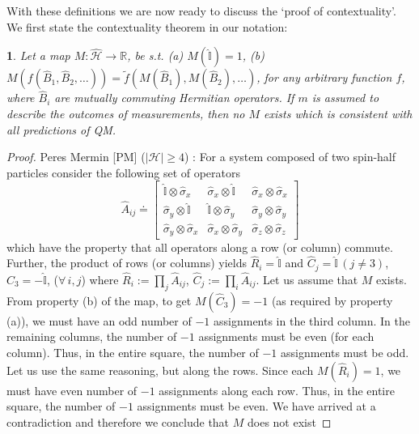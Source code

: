 \documentclass[british,aps,prl,superscriptaddress,nofootinbib,times,reprint]{revtex4-1}
\theoremstyle{plain}
\theoremstyle{plain}
\newtheorem*{thm*}{\protect\theoremname}
\theoremstyle{definition}
\theoremstyle{remark}
\theoremstyle{remark}
\theoremstyle{remark}
\theoremstyle{plain}
\theoremstyle{plain}
\theoremstyle{plain}
\theoremstyle{definition}
\theoremstyle{definition}
\providecommand{\theoremname}{Theorem}
\begin{document}
With these definitions we are now ready to discuss
the `proof of contextuality'. We first state the
contextuality theorem in our notation:
\begin{thm*} Let a map
$M:\hat{\mathcal{H}}\to\mathbb{R}$, be s.t. (a)
$M(\hat{\mathbb{I}})=1$, (b)
$M(f(\hat{B}_{1},\hat{B}_{2},\dots))=\tilde
f(M(\hat{B}_{1}),M(\hat{B}_{2}),\dots)$, for any
arbitrary function $f$, where $\hat{B}_{i}$ are
mutually commuting Hermitian operators. If $m$ is
assumed to describe the outcomes of measurements,
then no $M$ exists which is consistent with all
predictions of QM. 
\label{thm:KS}
\end{thm*}

\begin{proof} Peres Mermin [PM]
($\left|\mathcal{H}\right|\ge4$)
\cite{Peres,Mermin}:
For a system composed of two spin-half particles 
consider the following set of operators \[
\hat{A}_{ij}\doteq\left[\begin{array}{ccc}
\hat{\mathbb{I}}\otimes\hat{\sigma}_{x} &
\hat{\sigma}_{x}\otimes\hat{\mathbb{I}} &
\hat{\sigma}_{x}\otimes\hat{\sigma}_{x}\\
\hat{\sigma}_{y}\otimes\hat{\mathbb{I}} &
\hat{\mathbb{I}}\otimes\hat{\sigma}_{y} &
\hat{\sigma}_{y}\otimes\hat{\sigma}_{y}\\
\hat{\sigma}_{y}\otimes\hat{\sigma}_{x} &
\hat{\sigma}_{x}\otimes\hat{\sigma}_{y} &
\hat{\sigma}_{z}\otimes\hat{\sigma}_{z}
\end{array}\right] \] which have the property that
all operators along a row (or column) commute. Further,
the product of rows (or columns) yields
$\hat{R}_{i}=\hat{\mathbb{I}}$ and
$\hat{C}_{j}=\hat{\mathbb{I}}\,(j\neq3)$,
$\hat{C}_{3}=-\hat{\mathbb{I}}$, ($\forall\,i,j$) where
$\hat{R}_{i}:=\prod_{j}\hat{A}_{ij}$,
$\hat{C}_{j}:=\prod_{i}\hat{A}_{ij}$. Let us
assume that $M$ exists. From property (b) of the
map, to get $M(\hat{C}_{3})=-1$ (as required by
property (a)), we must have an odd number of $-1$
assignments in the third column. In the remaining
columns, the number of $-1$ assignments must be
even (for each column). Thus, in the entire
square, the number of $-1$ assignments must be
odd. Let us use the same reasoning, but along the
rows. Since each $M(\hat{R}_{i})=1$, we must have
even number of $-1$ assignments along each row.
Thus, in the entire square, the number of $-1$
assignments must be even. We have arrived at a
contradiction and therefore we conclude 
that $M$ does not exist
\end{proof}
\end{document}
